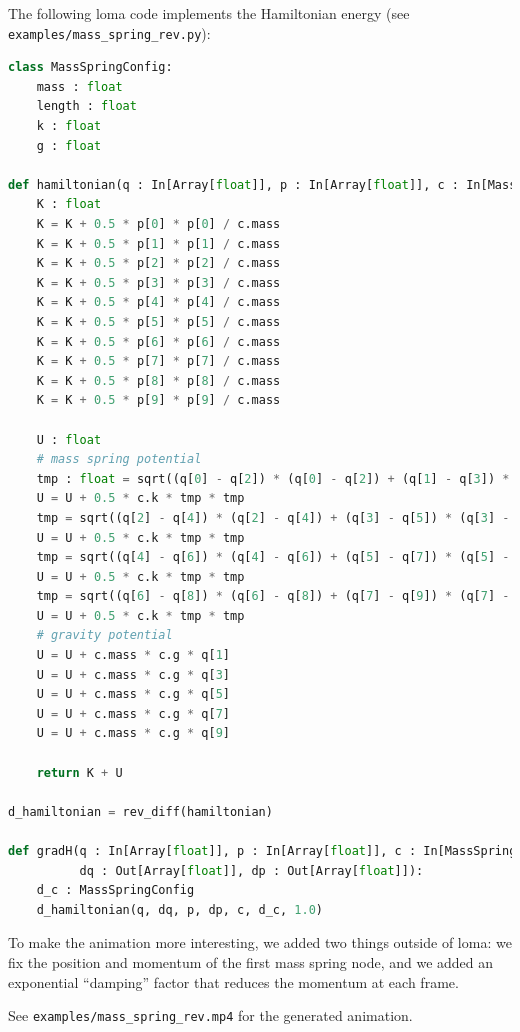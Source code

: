 The following loma code implements the Hamiltonian energy (see \lstinline{examples/mass_spring_rev.py}):
\begin{lstlisting}[language=Python]
class MassSpringConfig:
    mass : float
    length : float
    k : float
    g : float

def hamiltonian(q : In[Array[float]], p : In[Array[float]], c : In[MassSpringConfig]) -> float:
    K : float
    K = K + 0.5 * p[0] * p[0] / c.mass
    K = K + 0.5 * p[1] * p[1] / c.mass
    K = K + 0.5 * p[2] * p[2] / c.mass
    K = K + 0.5 * p[3] * p[3] / c.mass
    K = K + 0.5 * p[4] * p[4] / c.mass
    K = K + 0.5 * p[5] * p[5] / c.mass
    K = K + 0.5 * p[6] * p[6] / c.mass
    K = K + 0.5 * p[7] * p[7] / c.mass
    K = K + 0.5 * p[8] * p[8] / c.mass
    K = K + 0.5 * p[9] * p[9] / c.mass

    U : float
    # mass spring potential
    tmp : float = sqrt((q[0] - q[2]) * (q[0] - q[2]) + (q[1] - q[3]) * (q[1] - q[3])) - c.length
    U = U + 0.5 * c.k * tmp * tmp
    tmp = sqrt((q[2] - q[4]) * (q[2] - q[4]) + (q[3] - q[5]) * (q[3] - q[5])) - c.length
    U = U + 0.5 * c.k * tmp * tmp
    tmp = sqrt((q[4] - q[6]) * (q[4] - q[6]) + (q[5] - q[7]) * (q[5] - q[7])) - c.length
    U = U + 0.5 * c.k * tmp * tmp
    tmp = sqrt((q[6] - q[8]) * (q[6] - q[8]) + (q[7] - q[9]) * (q[7] - q[9])) - c.length
    U = U + 0.5 * c.k * tmp * tmp
    # gravity potential
    U = U + c.mass * c.g * q[1]
    U = U + c.mass * c.g * q[3]
    U = U + c.mass * c.g * q[5]
    U = U + c.mass * c.g * q[7]
    U = U + c.mass * c.g * q[9]

    return K + U

d_hamiltonian = rev_diff(hamiltonian)

def gradH(q : In[Array[float]], p : In[Array[float]], c : In[MassSpringConfig],
          dq : Out[Array[float]], dp : Out[Array[float]]):
    d_c : MassSpringConfig
    d_hamiltonian(q, dq, p, dp, c, d_c, 1.0)
\end{lstlisting}

To make the animation more interesting, we added two things outside of loma: we fix the position and momentum of the first mass spring node, and we added an exponential ``damping'' factor that reduces the momentum at each frame.

See \lstinline{examples/mass_spring_rev.mp4} for the generated animation.


